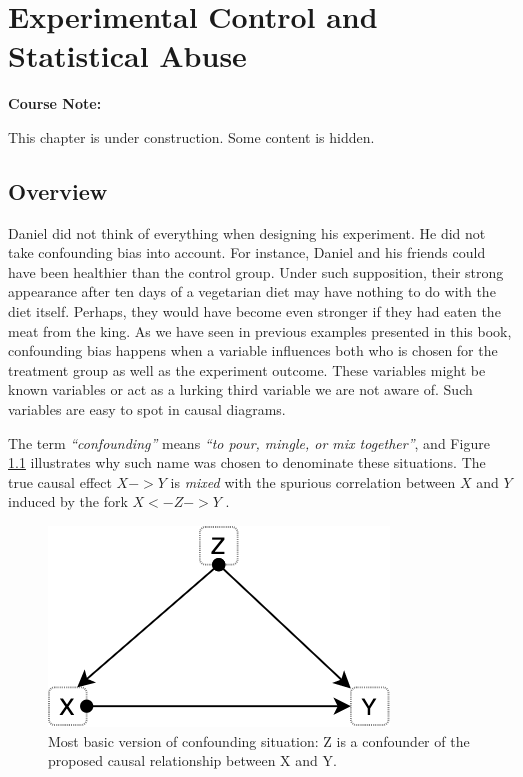 \documentclass[
]{book}
\begin{document}
\hypertarget{stats-abuse}{%
\chapter{Experimental Control and Statistical Abuse}\label{stats-abuse}}

\begin{notebox}

\begin{center}
\textbf{Course Note:}

\end{center}

This chapter is under construction. Some content is hidden.

\end{notebox}

\hypertarget{overview-2}{%
\section{Overview}\label{overview-2}}

Daniel did not think of everything when designing his experiment. He did not take confounding bias into account. For instance, Daniel and his friends could have been healthier than the control group. Under such supposition, their strong appearance after ten days of a vegetarian diet may have nothing to do with the diet itself. Perhaps, they would have become even stronger if they had eaten the meat from the king. As we have seen in previous examples presented in this book, confounding bias happens when a variable influences both who is chosen for the treatment group as well as the experiment outcome. These variables might be known variables or act as a lurking third variable we are not aware of. Such variables are easy to spot in causal diagrams.

The term \emph{``confounding''} means \emph{``to pour, mingle, or mix together''}, and Figure \ref{fig:confounder-simple} illustrates why such name was chosen to denominate these situations. The true causal effect \(X -> Y\) is \emph{mixed} with the spurious correlation between \(X\) and \(Y\) induced by the fork \(X <- Z -> Y\) \citep{book-of-why}.

\begin{figure}

{\centering \includegraphics[width=0.33\linewidth]{Figures/causal_diagram_confounder_simple} 

}

\caption{Most basic version of confounding situation: Z is a confounder of the proposed causal relationship between X and Y.}\label{fig:confounder-simple}
\end{figure}
\end{document}

